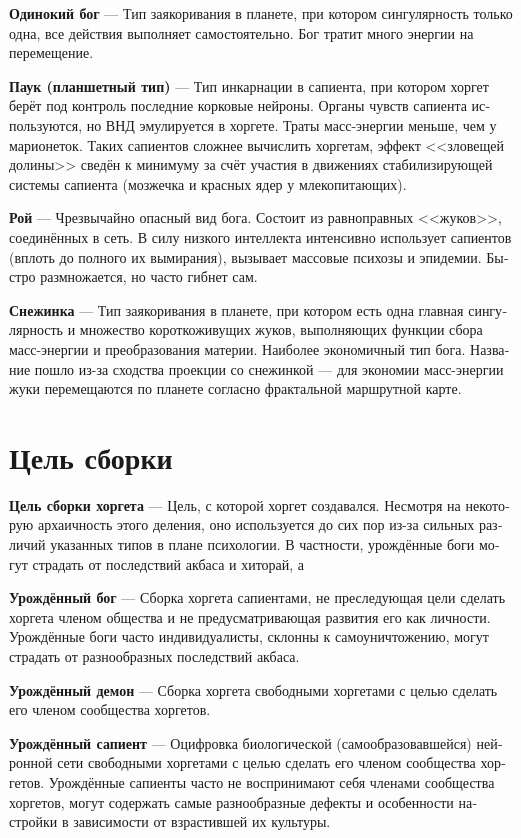 \documentclass[a4paper,12pt,fleqn]{book}\usepackage{polyglossia}\setdefaultlanguage[babelshorthands=true]{russian}\setotherlanguage{english}\defaultfontfeatures{Ligatures=TeX,Mapping=tex-text}\usepackage{xcolor}\newcommand{\ml}[3]{#2}
\newcommand{\asterism}{\vspace{1em}{\centering\Large\bfseries$\ast~\ast~\ast$\par}\vspace{1em}}
\newcommand{\theterm}[3]{\textbf{\hypertarget{#1}{#2}} --- #3}
\begin{document}
\theterm{lonely-god}
{Одинокий бог}
{Тип заякоривания в планете, при котором сингулярность только одна, все действия выполняет самостоятельно.
Бог тратит много энергии на перемещение.}

\theterm{spider}
{Паук (планшетный тип)}
{Тип инкарнации в сапиента, при котором хоргет берёт под контроль последние корковые нейроны.
Органы чувств сапиента используются, но ВНД эмулируется в хоргете.
Траты масс-энергии меньше, чем у марионеток.
Таких сапиентов сложнее вычислить хоргетам, эффект <<зловещей долины>> сведён к минимуму за счёт участия в движениях стабилизирующей системы сапиента (мозжечка и красных ядер у млекопитающих).}

\theterm{swarm}
{Рой}
{Чрезвычайно опасный вид бога.
Состоит из равноправных <<жуков>>, соединённых в сеть.
В силу низкого интеллекта интенсивно использует сапиентов (вплоть до полного их вымирания), вызывает массовые психозы и эпидемии.
Быстро размножается, но часто гибнет сам.}

\theterm{snowflake}
{Снежинка}
{Тип заякоривания в планете, при котором есть одна главная сингулярность и множество короткоживущих жуков, выполняющих функции сбора масс-энергии и преобразования материи.
Наиболее экономичный тип бога.
Название пошло из-за сходства проекции со снежинкой --- для экономии масс-энергии жуки перемещаются по планете согласно фрактальной маршрутной карте.}

\section{Цель сборки}

\theterm{compilation-purpose}
{Цель сборки хоргета}
{Цель, с которой хоргет создавался.
Несмотря на некоторую архаичность этого деления, оно используется до сих пор из-за сильных различий указанных типов в плане психологии.
В частности, урождённые боги могут страдать от последствий акбаса и хиторай, а }

\asterism

\theterm{born-god}
{Урождённый бог}
{Сборка хоргета сапиентами, не преследующая цели сделать хоргета членом общества и не предусматривающая развития его как личности.
Урождённые боги часто индивидуалисты, склонны к самоуничтожению, могут страдать от разнообразных последствий акбаса.}

\theterm{born-daemon}
{Урождённый демон}
{Сборка хоргета свободными хоргетами с целью сделать его членом сообщества хоргетов.}

\theterm{born-sapient}
{Урождённый сапиент}
{Оцифровка биологической (самообразовавшейся) нейронной сети свободными хоргетами с целью сделать его членом сообщества хоргетов.
Урождённые сапиенты часто не воспринимают себя членами сообщества хоргетов, могут содержать самые разнообразные дефекты и особенности настройки в зависимости от взрастившей их культуры.}
\end{document}
